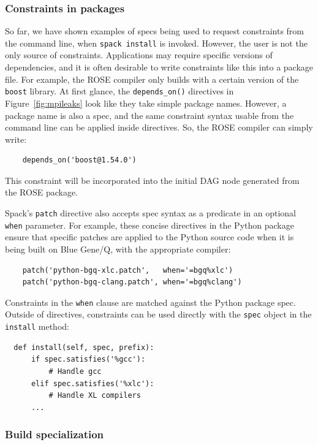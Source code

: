 \subsubsection{Constraints in packages}

So far, we have shown examples of specs being used to request constraints from the
command line, when {\tt spack install} is invoked.  However, the user is not the only
source of constraints.  Applications may require specific versions of dependencies,
and it is often desirable to write constraints like this into a package file.  For
example, the ROSE compiler only builds with a certain version of the {\tt boost} library.
At first glance, the {\tt depends\_on()} directives in Figure~\ref{fig:mpileaks} look
like they take simple package names.  However, a package name is also a spec, and
the same constraint syntax usable from the command line can be applied inside directives.
So, the ROSE compiler can simply write:
%
\begin{verbatim}
    depends_on('boost@1.54.0')
\end{verbatim}
%
This constraint will be incorporated into the initial DAG node generated from
the ROSE package.

Spack's {\tt patch} directive also accepts spec syntax as a predicate in an
optional {\tt when} parameter.  For example, these concise directives in the
Python package ensure that specific patches are applied to the Python source
code when it is being built on Blue Gene/Q, with the appropriate compiler:
%
\begin{verbatim}
    patch('python-bgq-xlc.patch',   when='=bgq%xlc')
    patch('python-bgq-clang.patch', when='=bgq%clang')
\end{verbatim}
%
Constraints in the {\tt when} clause are matched against the Python package spec.
Outside of directives, constraints can be used directly
with the {\tt spec} object in the {\tt install} method:
%
\begin{verbatim}
  def install(self, spec, prefix):
      if spec.satisfies('%gcc'):
          # Handle gcc
      elif spec.satisfies('%xlc'):
          # Handle XL compilers
      ...
\end{verbatim}
%

\subsubsection{Build specialization}

